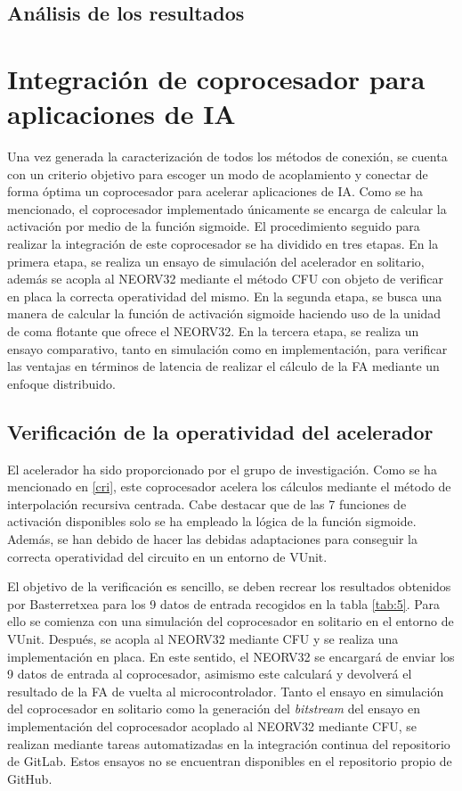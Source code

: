 \subsection{Análisis de los resultados}

\section{Integración de coprocesador para aplicaciones de IA}

\label{Integ}

Una vez generada la caracterización de todos los métodos de conexión, se cuenta con un criterio objetivo para escoger un modo de acoplamiento y conectar de forma óptima un coprocesador para acelerar aplicaciones de IA.
Como se ha mencionado, el coprocesador implementado únicamente se encarga de calcular la activación por medio de la función sigmoide.
El procedimiento seguido para realizar la integración de este coprocesador se ha dividido en tres etapas. 
En la primera etapa, se realiza un ensayo de simulación del acelerador en solitario, además se acopla al NEORV32 mediante el método CFU con objeto de verificar en placa la correcta operatividad del mismo.
En la segunda etapa, se busca una manera de calcular la función de activación sigmoide haciendo uso de la unidad de coma flotante que ofrece el NEORV32.
En la tercera etapa, se realiza un ensayo comparativo, tanto en simulación como en implementación, para verificar las ventajas en términos de latencia de realizar el cálculo de la FA mediante un enfoque distribuido.

\subsection{Verificación de la operatividad del acelerador}

El acelerador ha sido proporcionado por el grupo de investigación.
Como se ha mencionado en \ref{cri}, este coprocesador acelera los cálculos mediante el método de interpolación recursiva centrada.
Cabe destacar que de las 7 funciones de activación disponibles solo se ha empleado la lógica de la función sigmoide.
Además, se han debido de hacer las debidas adaptaciones para conseguir la correcta operatividad del circuito en un entorno de VUnit.

El objetivo de la verificación es sencillo, se deben recrear los resultados obtenidos por Basterretxea para los 9 datos de entrada recogidos en la tabla \ref{tab:5}.
Para ello se comienza con una simulación del coprocesador en solitario en el entorno de VUnit.
Después, se acopla al NEORV32 mediante CFU y se realiza una implementación en placa.
En este sentido, el NEORV32 se encargará de enviar los 9 datos de entrada al coprocesador, asimismo este calculará y devolverá el resultado de la FA de vuelta al microcontrolador.
Tanto el ensayo en simulación del coprocesador en solitario como la generación del \textit{bitstream} del ensayo en implementación del coprocesador acoplado al NEORV32 mediante CFU, se realizan mediante tareas automatizadas en la integración continua del repositorio de GitLab.
Estos ensayos no se encuentran disponibles en el repositorio propio de GitHub.

